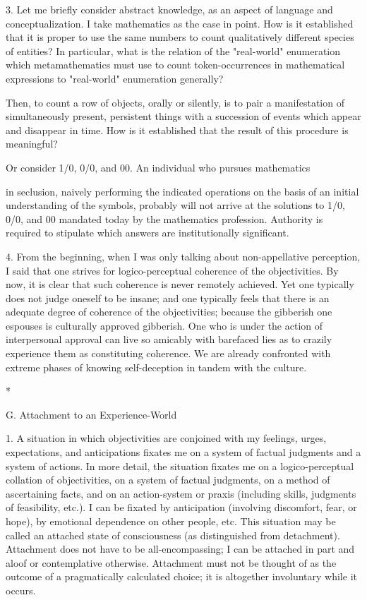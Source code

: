 3. Let me briefly consider abstract knowledge, as an aspect of language and conceptualization. I take mathematics as the case in point. How is it established that it is proper to use the same numbers to count qualitatively different species of entities? In particular, what is the relation of the "real-world" enumeration which metamathematics must use to count token-occurrences in mathematical expressions to "real-world" enumeration generally?

Then, to count a row of objects, orally or silently, is to pair a manifestation of simultaneously present, persistent things with a succession of events which appear and disappear in time. How is it established that the result of this procedure is meaningful?

Or consider 1/0, 0/0, and 00. An individual who pursues mathematics

in seclusion, naively performing the indicated operations on the basis of an initial understanding of the symbols, probably will not arrive at the solutions to 1/0, 0/0, and 00 mandated today by the mathematics profession. Authority is required to stipulate which answers are institutionally significant.

4. From the beginning, when I was only talking about non-appellative perception, I said that one strives for logico-perceptual coherence of the objectivities. By now, it is clear that such coherence is never remotely achieved. Yet one typically does not judge oneself to be insane; and one typically feels that there is an adequate degree of coherence of the objectivities; because the gibberish one espouses is culturally approved gibberish. One who is under the action of interpersonal approval can live so amicably with barefaced lies as to crazily experience them as constituting coherence. We are already confronted with extreme phases of knowing self-deception in tandem with the culture.

*

G. Attachment to an Experience-World

1. A situation in which objectivities are conjoined with my feelings, urges, expectations, and anticipations fixates me on a system of factual judgments and a system of actions. In more detail, the situation fixates me on a logico-perceptual collation of objectivities, on a system of factual judgments, on a method of ascertaining facts, and on an action-system or praxis (including skills, judgments of feasibility, etc.). I can be fixated by anticipation (involving discomfort, fear, or hope), by emotional dependence on other people, etc. This situation may be called an attached state of consciousness (as distinguished from detachment). Attachment does not have to be all-encompassing; I can be attached in part and aloof or contemplative otherwise. Attachment must not be thought of as the outcome of a pragmatically calculated choice; it is altogether involuntary while it occurs.

